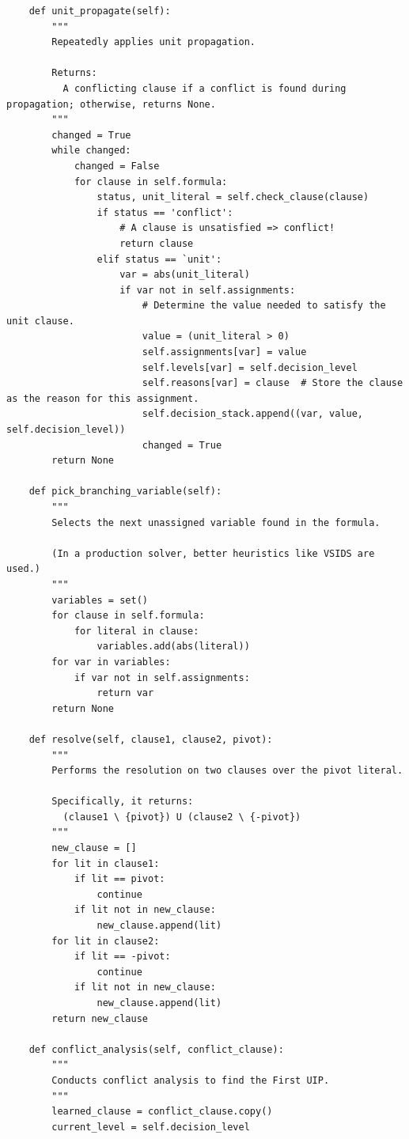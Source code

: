 \begin{lstlisting}
    def unit_propagate(self):
        """
        Repeatedly applies unit propagation.
        
        Returns:
          A conflicting clause if a conflict is found during propagation; otherwise, returns None.
        """
        changed = True
        while changed:
            changed = False
            for clause in self.formula:
                status, unit_literal = self.check_clause(clause)
                if status == 'conflict':
                    # A clause is unsatisfied => conflict!
                    return clause
                elif status == `unit':
                    var = abs(unit_literal)
                    if var not in self.assignments:
                        # Determine the value needed to satisfy the unit clause.
                        value = (unit_literal > 0)
                        self.assignments[var] = value
                        self.levels[var] = self.decision_level
                        self.reasons[var] = clause  # Store the clause as the reason for this assignment.
                        self.decision_stack.append((var, value, self.decision_level))
                        changed = True
        return None

    def pick_branching_variable(self):
        """
        Selects the next unassigned variable found in the formula.
        
        (In a production solver, better heuristics like VSIDS are used.)
        """
        variables = set()
        for clause in self.formula:
            for literal in clause:
                variables.add(abs(literal))
        for var in variables:
            if var not in self.assignments:
                return var
        return None

    def resolve(self, clause1, clause2, pivot):
        """
        Performs the resolution on two clauses over the pivot literal.
        
        Specifically, it returns:
          (clause1 \ {pivot}) U (clause2 \ {-pivot})
        """
        new_clause = []
        for lit in clause1:
            if lit == pivot:
                continue
            if lit not in new_clause:
                new_clause.append(lit)
        for lit in clause2:
            if lit == -pivot:
                continue
            if lit not in new_clause:
                new_clause.append(lit)
        return new_clause

    def conflict_analysis(self, conflict_clause): 
        """
        Conducts conflict analysis to find the First UIP.
        """
        learned_clause = conflict_clause.copy()
        current_level = self.decision_level


\end{lstlisting}
